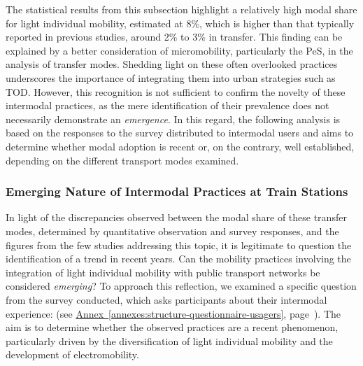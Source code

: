 \begin{refsegment}
The statistical results from this subsection highlight a relatively high modal share for light individual mobility, estimated at 8\%, which is higher than that typically reported in previous studies, around 2\% to 3\% in transfer. This finding can be explained by a better consideration of micromobility, particularly the \acrshort{PeS}, in the analysis of transfer modes. Shedding light on these often overlooked practices underscores the importance of integrating them into urban strategies such as \acrshort{TOD}. However, this recognition is not sufficient to confirm the novelty of these intermodal practices, as the mere identification of their prevalence does not necessarily demonstrate an \textsl{emergence}. In this regard, the following analysis is based on the responses to the survey distributed to intermodal users and aims to determine whether modal adoption is recent or, on the contrary, well established, depending on the different transport modes examined.%

\subsubsection*{Emerging Nature of Intermodal Practices at Train Stations
    \label{chap4:emergence-pratiques-intermodales}
    }

In light of the discrepancies observed between the modal share of these transfer modes, determined by quantitative observation and survey responses, and the figures from the few studies addressing this topic, it is legitimate to question the identification of a trend in recent years. Can the mobility practices involving the integration of light individual mobility with public transport networks be considered \textsl{emerging}? To approach this reflection, we examined a specific question from the survey conducted, which asks participants about their intermodal experience:  (see \hyperref[annexes:structure-questionnaire-usagers]{Annex~\ref{annexes:structure-questionnaire-usagers}}, page~\pageref{annexes:structure-questionnaire-usagers}). The aim is to determine whether the observed practices are a recent phenomenon, particularly driven by the diversification of light individual mobility and the development of electromobility.%


\end{refsegment}
